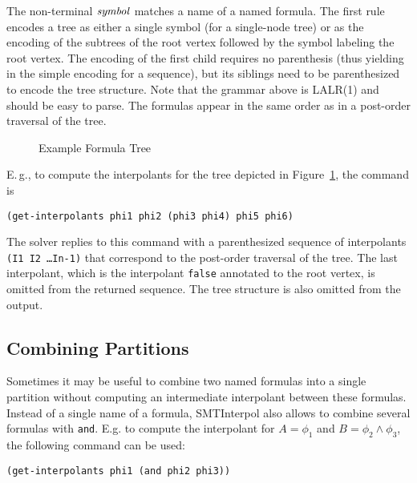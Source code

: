 \documentclass[a4paper,12pt]{article}
\begin{document}
The non-terminal $\mathop{\mathit{symbol}}$ matches a name of a named
formula.  The first rule encodes a tree as either a single symbol (for
a single-node tree) or as the encoding of the subtrees of the root
vertex followed by the symbol labeling the root vertex.  The encoding
of the first child requires no parenthesis (thus yielding in the
simple encoding for a sequence), but its siblings need to be
parenthesized to encode the tree structure.  Note that the grammar
above is LALR(1) and should be easy to parse.  The formulas appear in
the same order as in a post-order traversal of the tree.
%
\begin{figure}
  \begin{center}
  \end{center}
  \caption{\label{fig:treeipex}Example Formula Tree}
\end{figure}
%
E.\,g., to compute the interpolants for the tree depicted in
Figure~\ref{fig:treeipex}, the command is
\begin{verbatim}
(get-interpolants phi1 phi2 (phi3 phi4) phi5 phi6)
\end{verbatim}

The solver replies to this command with a parenthesized sequence of
interpolants \texttt{(I1 I2 \dots In-1)} that correspond to the
post-order traversal of the tree.  The last interpolant, which is the
interpolant \texttt{false} annotated to the root vertex, is omitted
from the returned sequence.  The tree structure is also omitted from
the output.

\subsection*{Combining Partitions}

Sometimes it may be useful to combine two named formulas into a single
partition without computing an intermediate interpolant between these
formulas.  Instead of a single name of a formula, SMTInterpol also allows to combine several formulas with \texttt{and}.  E.g. to compute the interpolant for $A=\phi_1$ and $B=\phi_2 \land \phi_3$, the following command can be used:
\begin{verbatim}
(get-interpolants phi1 (and phi2 phi3))
\end{verbatim}
\end{document}
